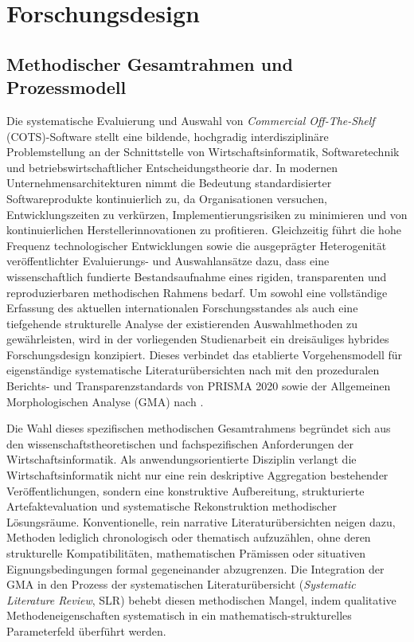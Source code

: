\section{Forschungsdesign}
\label{sec:forschungsdesign}

\subsection{Methodischer Gesamtrahmen und Prozessmodell}
\label{subsec:methodischer_gesamtrahmen}

Die systematische Evaluierung und Auswahl von \textit{Commercial Off-The-Shelf} (COTS)-Software stellt eine bildende, hochgradig interdisziplinäre Problemstellung an der Schnittstelle von Wirtschaftsinformatik, Softwaretechnik und betriebswirtschaftlicher Entscheidungstheorie dar. In modernen Unternehmensarchitekturen nimmt die Bedeutung standardisierter Softwareprodukte kontinuierlich zu, da Organisationen versuchen, Entwicklungszeiten zu verkürzen, Implementierungsrisiken zu minimieren und von kontinuierlichen Herstellerinnovationen zu profitieren. Gleichzeitig führt die hohe Frequenz technologischer Entwicklungen sowie die ausgeprägter Heterogenität veröffentlichter Evaluierungs- und Auswahlansätze dazu, dass eine wissenschaftlich fundierte Bestandsaufnahme eines rigiden, transparenten und reproduzierbaren methodischen Rahmens bedarf. Um sowohl eine vollständige Erfassung des aktuellen internationalen Forschungsstandes als auch eine tiefgehende strukturelle Analyse der existierenden Auswahlmethoden zu gewährleisten, wird in der vorliegenden Studienarbeit ein dreisäuliges hybrides Forschungsdesign konzipiert. Dieses verbindet das etablierte Vorgehensmodell für eigenständige systematische Literaturübersichten nach \cite{2NHFUF5N} mit den prozeduralen Berichts- und Transparenzstandards von PRISMA 2020 \cite{BP42WGEK} sowie der Allgemeinen Morphologischen Analyse (GMA) nach \cite{Z6N6V5L9}.

Die Wahl dieses spezifischen methodischen Gesamtrahmens begründet sich aus den wissenschaftstheoretischen und fachspezifischen Anforderungen der Wirtschaftsinformatik. Als anwendungsorientierte Disziplin verlangt die Wirtschaftsinformatik nicht nur eine rein deskriptive Aggregation bestehender Veröffentlichungen, sondern eine konstruktive Aufbereitung, strukturierte Artefaktevaluation und systematische Rekonstruktion methodischer Lösungsräume. Konventionelle, rein narrative Literaturübersichten neigen dazu, Methoden lediglich chronologisch oder thematisch aufzuzählen, ohne deren strukturelle Kompatibilitäten, mathematischen Prämissen oder situativen Eignungsbedingungen formal gegeneinander abzugrenzen. Die Integration der GMA in den Prozess der systematischen Literaturübersicht (\textit{Systematic Literature Review}, SLR) behebt diesen methodischen Mangel, indem qualitative Methodeneigenschaften systematisch in ein mathematisch-strukturelles Parameterfeld überführt werden.

